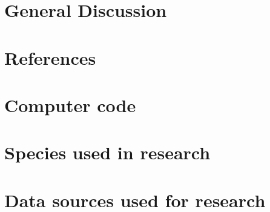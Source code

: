 \documentclass[titlesmallcaps,copyrightpage,examinerscopy]{uomthesis}
\begin{document}

\clearpage{\pagestyle{empty}\cleardoublepage}

%
\chapter{General Discussion}\label{sec:conc}
\clearpage{\pagestyle{empty}\cleardoublepage}

%

{
\backmatter
\chapter{References}

\clearpage{\pagestyle{empty}\cleardoublepage}
}

\clearpage
\appendix
{}
\clearpage{\pagestyle{empty}\cleardoublepage}

%
\chapter{Computer code}\label{apx:A}
\clearpage{\pagestyle{empty}\cleardoublepage}

%
\chapter{Species used in research}\label{apx:B}
\clearpage{\pagestyle{empty}\cleardoublepage}

%
\chapter{Data sources used for research}\label{apx:C}
\clearpage{\pagestyle{empty}\cleardoublepage}


\clearpage{\pagestyle{empty}\cleardoublepage}
\end{document}
